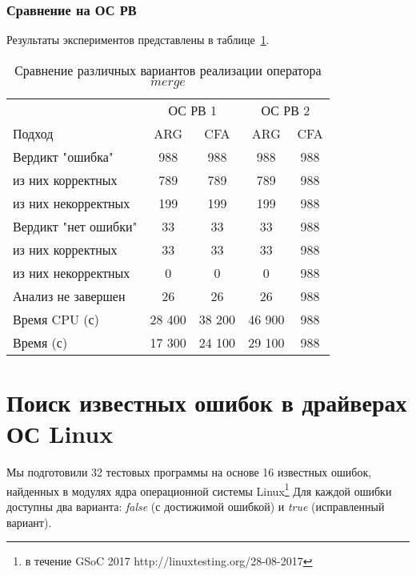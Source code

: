 \subsubsection{Сравнение на ОС РВ}
Результаты экспериментов представлены в таблице~\ref{table-drivers-lock-merge}.

\begin{center}
  \begin{table}[h]\footnotesize
  	\label{table-drivers-lock-merge}
    \caption{Сравнение различных вариантов реализации оператора $merge$}
    \begin{tabular}{ | l | c | c | c | c | }
      \hline
      		& 		\multicolumn{2}{|c|}{ОС РВ 1} & \multicolumn{2}{|c|}{ОС РВ 2} \\
      Подход         				& ARG 	& CFA 		& ARG   	& CFA    \\ \hline
      Вердикт "ошибка" 				& 988   & 988       & 988       & 988        \\ 
  \hspace{0.5cm} из них корректных 	& 789 	& 789 		& 789     	& 988       \\ 
  \hspace{0.5cm} из них некорректных & 199 	& 199 		& 199     	& 988       \\ \hline
      Вердикт "нет ошибки"  		& 33    & 33        & 33     	& 988      \\ 
  \hspace{0.5cm} из них корректных 	& 33 	& 33    	& 33       	& 988     \\
  \hspace{0.5cm} из них некорректных & 0 	& 0    		& 0      	& 988    \\ \hline
      Анализ не завершен       		& 26    & 26        & 26     	& 988      \\ \hline
      Время CPU (с)   				& 28 400 & 38 200   & 46 900   	& 988    \\ 
      Время (с)  					& 17 300 & 24 100   & 29 100    & 988     \\
      \hline
    \end{tabular}
  \end{table}
\end{center}


\section{Поиск известных ошибок в драйверах ОС Linux}
Мы подготовили 32 тестовых программы на основе 16 известных ошибок, найденных в модулях ядра операционной системы Linux\footnote{в течение GSoC 2017 http://linuxtesting.org/28-08-2017}
Для каждой ошибки доступны два варианта: {\em false} (с достижимой ошибкой) и {\em true} (исправленный вариант).

